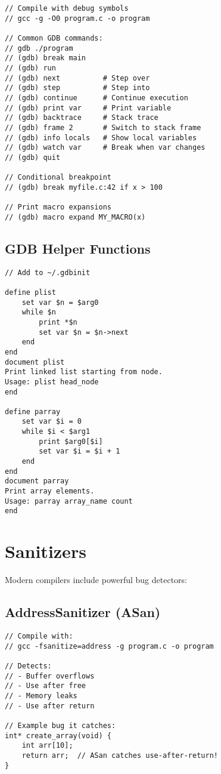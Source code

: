 \begin{lstlisting}
// Compile with debug symbols
// gcc -g -O0 program.c -o program

// Common GDB commands:
// gdb ./program
// (gdb) break main
// (gdb) run
// (gdb) next          # Step over
// (gdb) step          # Step into
// (gdb) continue      # Continue execution
// (gdb) print var     # Print variable
// (gdb) backtrace     # Stack trace
// (gdb) frame 2       # Switch to stack frame
// (gdb) info locals   # Show local variables
// (gdb) watch var     # Break when var changes
// (gdb) quit

// Conditional breakpoint
// (gdb) break myfile.c:42 if x > 100

// Print macro expansions
// (gdb) macro expand MY_MACRO(x)
\end{lstlisting}

\subsection{GDB Helper Functions}

\begin{lstlisting}
// Add to ~/.gdbinit

define plist
    set var $n = $arg0
    while $n
        print *$n
        set var $n = $n->next
    end
end
document plist
Print linked list starting from node.
Usage: plist head_node
end

define parray
    set var $i = 0
    while $i < $arg1
        print $arg0[$i]
        set var $i = $i + 1
    end
end
document parray
Print array elements.
Usage: parray array_name count
end
\end{lstlisting}

\section{Sanitizers}

Modern compilers include powerful bug detectors:

\subsection{AddressSanitizer (ASan)}

\begin{lstlisting}
// Compile with:
// gcc -fsanitize=address -g program.c -o program

// Detects:
// - Buffer overflows
// - Use after free
// - Memory leaks
// - Use after return

// Example bug it catches:
int* create_array(void) {
    int arr[10];
    return arr;  // ASan catches use-after-return!
}
\end{lstlisting}

